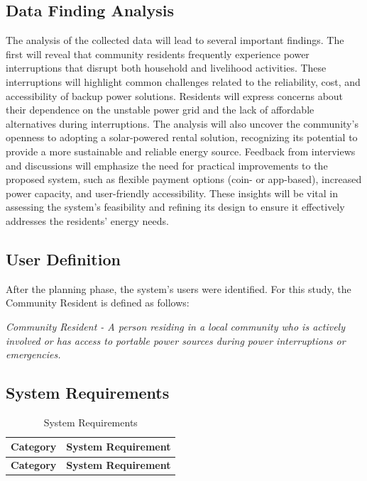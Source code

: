 {\subsection{Data Finding Analysis}

The analysis of the collected data will lead to several important findings. The first will reveal that community residents frequently experience power interruptions that disrupt both household and livelihood activities. These interruptions will highlight common challenges related to the reliability, cost, and accessibility of backup power solutions. Residents will express concerns about their dependence on the unstable power grid and the lack of affordable alternatives during interruptions. The analysis will also uncover the community’s openness to adopting a solar-powered rental solution, recognizing its potential to provide a more sustainable and reliable energy source. Feedback from interviews and discussions will emphasize the need for practical improvements to the proposed system, such as flexible payment options (coin- or app-based), increased power capacity, and user-friendly accessibility. These insights will be vital in assessing the system’s feasibility and refining its design to ensure it effectively addresses the residents’ energy needs.

\subsection{User Definition}

After the planning phase, the system’s users were identified. For this study, the Community Resident is defined as follows:

\textit{Community Resident - A person residing in a local community who is actively involved or has access to portable power sources during power interruptions or emergencies.}

\subsection{System Requirements}

\begin{longtable}{p{4cm} p{9cm}}
	\caption{System Requirements} \label{tab:SystemRequirements} \\
	\toprule
	\textbf{Category} & \textbf{System Requirement} \\
	\midrule
	\endfirsthead
	
	\toprule
	\textbf{Category} & \textbf{System Requirement} \\
	\midrule
	\endhead
	

\end{longtable}}
